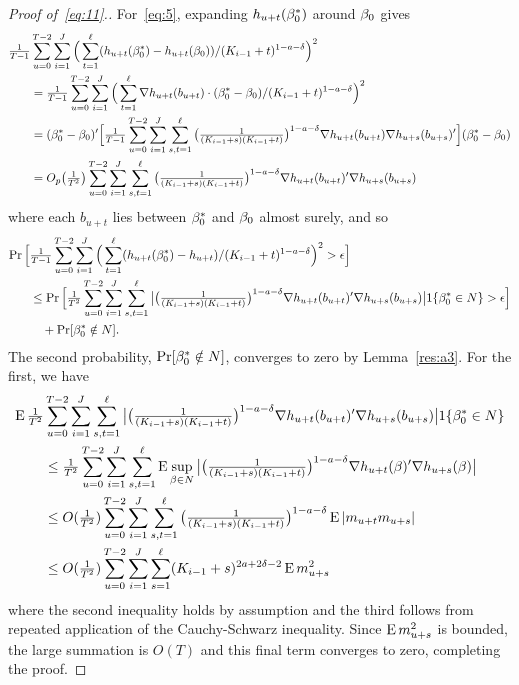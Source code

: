 \documentclass[12pt,fleqn]{article}
\begin{document}
\begin{proof}[Proof of~\eqref{eq:11}.]
For~\eqref{eq:5}, expanding $h_{u+t}(\beta_0^*)$ around $\beta_0$ gives
\begin{align*}
  \tfrac{1}{T-1} & \sum_{u = 0}^{T-2} \sum_{i=1}^J \Big(\sum_{t = 1}^{\ell} (h_{u + t}(\beta_0^*) - h_{u + t}(\beta_0))/ (K_{i-1} + t)^{1-a-\delta} \Big)^2 \\
  &= \tfrac{1}{T-1} \sum_{u = 0}^{T-2} \sum_{i=1}^J \Big(\sum_{t = 1}^{\ell}
  \nabla h_{u + t}(b_{u+t}) \cdot (\beta_0^* - \beta_0) / (K_{i-1} + t)^{1-a-\delta}\Big)^2 \\
  &= (\beta_0^* - \beta_0)' \Big[\tfrac{1}{T-1} \sum_{u = 0}^{T-2} \sum_{i=1}^J \sum_{s,t = 1}^{\ell}
  \big(\tfrac{1}{(K_{i-1} + s) (K_{i-1} + t)}\big)^{1-a-\delta} \nabla h_{u + t}(b_{u+t}) \nabla h_{u + s}(b_{u+s})' \Big] (\beta_0^* - \beta_0) \\
  &= O_p\big(\tfrac{1}{T^2}\big) \sum_{u = 0}^{T-2} \sum_{i=1}^J \sum_{s,t = 1}^{\ell}
  \big(\tfrac{1}{(K_{i-1} + s) (K_{i-1} + t)}\big)^{1-a-\delta} \nabla h_{u + t}(b_{u+t})' \nabla h_{u + s}(b_{u+s})
\end{align*}
where each $b_{u+t}$ lies between $\beta_0^*$ and $\beta_0$ almost surely, and so
\begin{align*}
  \operatorname{Pr}\Big[& \tfrac{1}{T-1} \sum_{u = 0}^{T-2} \sum_{i=1}^J
  \Big(\sum_{t = 1}^{\ell} (h_{u + t}(\beta_0^*) - h_{u + t})/ (K_{i-1} + t)^{1-a-\delta}\Big)^2 > \epsilon \Big] \\
  & \leq \operatorname{Pr}\Big[ \tfrac{1}{T^2} \sum_{u = 0}^{T-2} \sum_{i=1}^J \sum_{s,t = 1}^{\ell}
  \big\lvert \big(\tfrac{1}{(K_{i-1} + s) (K_{i-1} + t)}\big)^{1-a-\delta}
  \nabla h_{u + t}(b_{u+t})' \nabla h_{u + s}(b_{u+s}) \big\rvert 1\{\beta_0^* \in N\} > \epsilon \Big] \\
  &\quad + \operatorname{Pr}[\beta_0^* \notin N].
\end{align*}
The second probability, $\operatorname{Pr}[\beta_0^* \notin N]$, converges to zero by
Lemma~\ref{res:a3}. For the first, we have
\begin{align*}
  \operatorname{E} \tfrac{1}{T^2} &\sum_{u = 0}^{T-2} \sum_{i=1}^J \sum_{s,t = 1}^{\ell}
  \big\lvert \big(\tfrac{1}{(K_{i-1} + s) (K_{i-1} + t)}\big)^{1-a-\delta}
  \nabla h_{u + t}(b_{u+t})' \nabla h_{u + s}(b_{u+s}) \big\rvert 1\{\beta_0^* \in N\} \\
  &\leq \tfrac{1}{T^2} \sum_{u = 0}^{T-2} \sum_{i=1}^J \sum_{s,t = 1}^{\ell}
  \operatorname{E} \sup_{\beta \in N} \big\lvert \big(\tfrac{1}{(K_{i-1} + s) (K_{i-1} + t)}\big)^{1-a-\delta}
  \nabla h_{u + t}(\beta)' \nabla h_{u + s}(\beta) \big\rvert \\
  &\leq O(\tfrac{1}{T^2}) \sum_{u = 0}^{T-2} \sum_{i=1}^J \sum_{s,t = 1}^{\ell}
  \big(\tfrac{1}{(K_{i-1} + s) (K_{i-1} + t)}\big)^{1-a-\delta} \operatorname{E} | m_{u+t} m_{u+s} | \\
  &\leq O(\tfrac{1}{T^2}) \sum_{u=0}^{T-2} \sum_{i=1}^J \sum_{s = 1}^{\ell} (K_{i-1} + s)^{2a + 2\delta - 2} \operatorname{E} m_{u+s}^2
\end{align*}
where the second inequality holds by assumption and the third follows
from repeated application of the Cauchy-Schwarz inequality. Since $\operatorname{E}
m_{u+s}^2$ is bounded, the large summation is $O(T)$ and this final
term converges to zero, completing the proof.
\end{proof}
\end{document}
